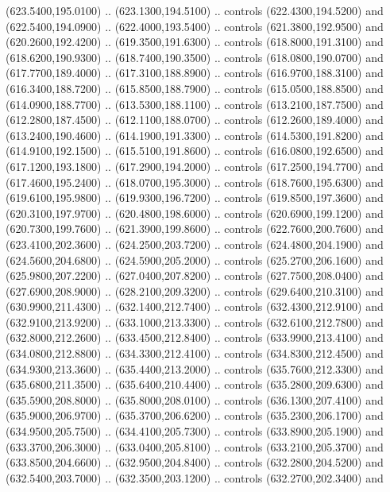 {\begin{scope}[y=0.80pt, x=0.80pt, yscale=-1, xscale=1, inner sep=0pt, outer sep=0pt, #1]
      (623.5400,195.0100) .. (623.1300,194.5100) .. controls (622.4300,194.5200) and
      (622.5400,194.0900) .. (622.4000,193.5400) .. controls (621.3800,192.9500) and
      (620.2600,192.4200) .. (619.3500,191.6300) .. controls (618.8000,191.3100) and
      (618.6200,190.9300) .. (618.7400,190.3500) .. controls (618.0800,190.0700) and
      (617.7700,189.4000) .. (617.3100,188.8900) .. controls (616.9700,188.3100) and
      (616.3400,188.7200) .. (615.8500,188.7900) .. controls (615.0500,188.8500) and
      (614.0900,188.7700) .. (613.5300,188.1100) .. controls (613.2100,187.7500) and
      (612.2800,187.4500) .. (612.1100,188.0700) .. controls (612.2600,189.4000) and
      (613.2400,190.4600) .. (614.1900,191.3300) .. controls (614.5300,191.8200) and
      (614.9100,192.1500) .. (615.5100,191.8600) .. controls (616.0800,192.6500) and
      (617.1200,193.1800) .. (617.2900,194.2000) .. controls (617.2500,194.7700) and
      (617.4600,195.2400) .. (618.0700,195.3000) .. controls (618.7600,195.6300) and
      (619.6100,195.9800) .. (619.9300,196.7200) .. controls (619.8500,197.3600) and
      (620.3100,197.9700) .. (620.4800,198.6000) .. controls (620.6900,199.1200) and
      (620.7300,199.7600) .. (621.3900,199.8600) .. controls (622.7600,200.7600) and
      (623.4100,202.3600) .. (624.2500,203.7200) .. controls (624.4800,204.1900) and
      (624.5600,204.6800) .. (624.5900,205.2000) .. controls (625.2700,206.1600) and
      (625.9800,207.2200) .. (627.0400,207.8200) .. controls (627.7500,208.0400) and
      (627.6900,208.9000) .. (628.2100,209.3200) .. controls (629.6400,210.3100) and
      (630.9900,211.4300) .. (632.1400,212.7400) .. controls (632.4300,212.9100) and
      (632.9100,213.9200) .. (633.1000,213.3300) .. controls (632.6100,212.7800) and
      (632.8000,212.2600) .. (633.4500,212.8400) .. controls (633.9900,213.4100) and
      (634.0800,212.8800) .. (634.3300,212.4100) .. controls (634.8300,212.4500) and
      (634.9300,213.3600) .. (635.4400,213.2000) .. controls (635.7600,212.3300) and
      (635.6800,211.3500) .. (635.6400,210.4400) .. controls (635.2800,209.6300) and
      (635.5900,208.8000) .. (635.8000,208.0100) .. controls (636.1300,207.4100) and
      (635.9000,206.9700) .. (635.3700,206.6200) .. controls (635.2300,206.1700) and
      (634.9500,205.7500) .. (634.4100,205.7300) .. controls (633.8900,205.1900) and
      (633.3700,206.3000) .. (633.0400,205.8100) .. controls (633.2100,205.3700) and
      (633.8500,204.6600) .. (632.9500,204.8400) .. controls (632.2800,204.5200) and
      (632.5400,203.7000) .. (632.3500,203.1200) .. controls (632.2700,202.3400) and

\end{scope}}
